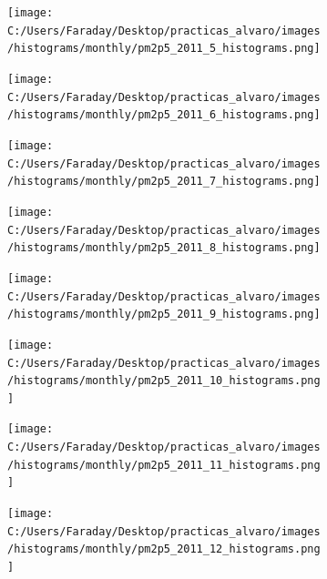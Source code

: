 \documentclass[12pt]{article}
\begin{document}
\begin{figure}[H]
\centering
\begin{subfigure}[h]{0.45\textwidth}
\texttt{[image: C:/Users/Faraday/Desktop/practicas\_alvaro/images/histograms/monthly/pm2p5\_2011\_5\_histograms.png]}
\caption{}
\label{fig:hist-mon-4-5-2011}
\end{subfigure}
%
\begin{subfigure}[H]{0.45\textwidth}
\texttt{[image: C:/Users/Faraday/Desktop/practicas\_alvaro/images/histograms/monthly/pm2p5\_2011\_6\_histograms.png]}
\caption{}
\label{fig:hist-mon-4-6-2011}
\end{subfigure}
\caption{}
\end{figure}

\newpage

\begin{figure}[H]
\centering
\begin{subfigure}[h]{0.45\textwidth}
\texttt{[image: C:/Users/Faraday/Desktop/practicas\_alvaro/images/histograms/monthly/pm2p5\_2011\_7\_histograms.png]}
\caption{}
\label{fig:hist-mon-4-7-2011}
\end{subfigure}
%
\begin{subfigure}[H]{0.45\textwidth}
\texttt{[image: C:/Users/Faraday/Desktop/practicas\_alvaro/images/histograms/monthly/pm2p5\_2011\_8\_histograms.png]}
\caption{}
\label{fig:hist-mon-4-8-2011}
\end{subfigure}
\caption{}
\end{figure}

\begin{figure}[H]
\centering
\begin{subfigure}[h]{0.45\textwidth}
\texttt{[image: C:/Users/Faraday/Desktop/practicas\_alvaro/images/histograms/monthly/pm2p5\_2011\_9\_histograms.png]}
\caption{}
\label{fig:hist-mon-4-9-2011}
\end{subfigure}
%
\begin{subfigure}[H]{0.45\textwidth}
\texttt{[image: C:/Users/Faraday/Desktop/practicas\_alvaro/images/histograms/monthly/pm2p5\_2011\_10\_histograms.png]}
\caption{}
\label{fig:hist-mon-4-10-2011}
\end{subfigure}
\caption{}
\end{figure}

\begin{figure}[H]
\centering
\begin{subfigure}[h]{0.45\textwidth}
\texttt{[image: C:/Users/Faraday/Desktop/practicas\_alvaro/images/histograms/monthly/pm2p5\_2011\_11\_histograms.png]}
\caption{}
\label{fig:hist-mon-4-11-2011}
\end{subfigure}
%
\begin{subfigure}[H]{0.45\textwidth}
\texttt{[image: C:/Users/Faraday/Desktop/practicas\_alvaro/images/histograms/monthly/pm2p5\_2011\_12\_histograms.png]}
\caption{}
\label{fig:hist-mon-4-12-2011}
\end{subfigure}
\caption{}
\end{figure}
\end{document}
